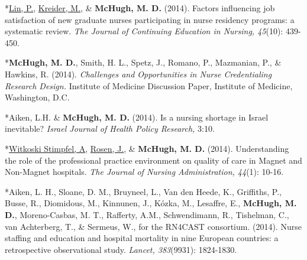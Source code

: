 \documentclass[10pt,]{article}
\begin{document}
{{{{{{{{{{{{{{\begin{hangparas}{.25in}{1}

*{\underline {Lin, P.}}, {\underline {Kreider, M.}}, \& {\textbf {McHugh, M. D.}} (2014). Factors influencing job satisfaction of new graduate nurses participating in nurse residency programs: a systematic review. {\textit {The Journal of Continuing Education in Nursing, 45}}(10): 439-450.

\end{hangparas}

\vspace{4mm}

\begin{hangparas}{.25in}{1}

*{\textbf {McHugh, M. D.}}, Smith, H. L., Spetz, J., Romano, P., Mazmanian, P., \& Hawkins, R. (2014). {\textit {Challenges and Opportunities in Nurse Credentialing Research Design.}} Institute of Medicine Discussion Paper, Institute of Medicine, Washington, D.C.

\end{hangparas}

\vspace{4mm}

\begin{hangparas}{.25in}{1}

*Aiken, L.H. \& {\textbf {McHugh, M. D.}} (2014). Is a nursing shortage in Israel inevitable? {\textit {Israel Journal of Health Policy Research,}} 3:10.

\end{hangparas}

\vspace{4mm}

\begin{hangparas}{.25in}{1}

*{\underline {Witkoski Stimpfel, A}}, {\underline {Rosen, J.}}, \& {\textbf {McHugh, M. D.}} (2014). Understanding the role of the professional practice environment on quality of care in Magnet and Non-Magnet hospitals. {\textit {The Journal of Nursing Administration, 44}}(1): 10-16.

\end{hangparas}

\vspace{4mm}

\begin{hangparas}{.25in}{1}

*Aiken, L. H., Sloane, D. M., Bruyneel, L., Van den Heede, K., Griffiths, P., Busse, R., Diomidous, M., Kinnunen, J., Kózka, M., Lesaffre, E., {\textbf {McHugh, M. D.}}, Moreno-Casbas, M. T., Rafferty, A.M., Schwendimann, R., Tishelman, C., van Achterberg, T., \& Sermeus, W., for the RN4CAST consortium. (2014). Nurse staffing and education and hospital mortality in nine European countries: a retrospective observational study. {\textit {Lancet, 383}}(9931): 1824-1830.


\end{hangparas}}}}}}}}}}}}}}}
\end{document}
